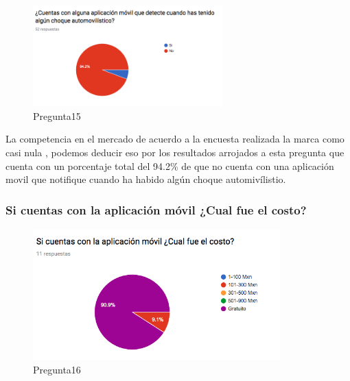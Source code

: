 \begin{figure}[htbp!]
	\begin{center}
		\includegraphics[width=0.65\textwidth]{DisenoEstructura/imagenes/Pregunta15}
		\caption{Pregunta15}
		\label{DE/FO/Pregunta15}
	\end{center}
\end{figure}

La competencia en el mercado de acuerdo a la encuesta realizada la marca como casi nula , podemos deducir eso por los resultados arrojados a esta pregunta que cuenta con un porcentaje total del 94.2\% de que no cuenta con una aplicación movil que notifique cuando ha habido algún choque automivílistio.\\

\subsubsection{Si cuentas con la aplicación móvil ¿Cual fue el costo?}

\begin{figure}[htbp!]
	\begin{center}
		\includegraphics[width=0.85\textwidth]{DisenoEstructura/imagenes/Pregunta16}
		\caption{Pregunta16}
		\label{DE/FO/Pregunta16}
	\end{center}
\end{figure}

